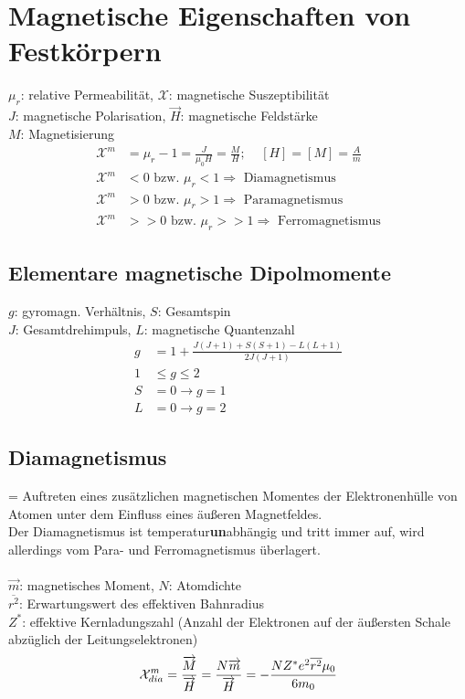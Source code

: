 \documentclass[a4paper,twocolumn,10pt]{article}
\begin{document}
\section{Magnetische Eigenschaften von Festkörpern}
$\mu_r$: relative Permeabilität, $\mathcal{X}$: magnetische Suszeptibilität\\
$J$: magnetische Polarisation, $\overrightarrow{H}$: magnetische Feldstärke\\
$M$: Magnetisierung
\begin{equation*}
\begin{split}
\mathcal{X}^m&=\mu_r-1=\frac{J}{\mu_0H}=\frac{M}{H};\;\;\;\;[H]=[M]=\frac{A}{m}\\
\mathcal{X}^m&<0\text{ bzw. }\mu_r<1\Rightarrow\text{ Diamagnetismus}\\
\mathcal{X}^m&>0\text{ bzw. }\mu_r>1\Rightarrow\text{ Paramagnetismus}\\
\mathcal{X}^m&>>0\text{ bzw. }\mu_r>>1\Rightarrow\text{ Ferromagnetismus}
\end{split}
\end{equation*}

\subsection{Elementare magnetische Dipolmomente}
$g$: gyromagn. Verhältnis, $S$: Gesamtspin\\
$J$: Gesamtdrehimpuls, $L$: magnetische Quantenzahl
\begin{equation*}
\begin{split}
g&=1+\frac{J(J+1)+S(S+1)-L(L+1)}{2J(J+1)}\\
1&\leq g\leq 2\\
S&=0\rightarrow g=1\\
L&=0\rightarrow g=2
\end{split}
\end{equation*}

\subsection{Diamagnetismus}
= Auftreten eines zusätzlichen magnetischen Momentes der Elektronenhülle von Atomen unter dem Einfluss eines äußeren Magnetfeldes.\\
Der Diamagnetismus ist temperatur\textbf{un}abhängig und tritt immer auf, wird allerdings vom Para- und Ferromagnetismus überlagert.\\\\
$\overrightarrow{m}$: magnetisches Moment, $N$: Atomdichte\\
$\overline{r^2}$: Erwartungswert des effektiven Bahnradius\\
$Z^*$: effektive Kernladungszahl (Anzahl der Elektronen auf der äußersten Schale abzüglich der Leitungselektronen)
\begin{equation*}
\mathcal{X}_{dia}^m=\frac{\overrightarrow{M}}{\overrightarrow{H}}=\frac{N\overrightarrow{m}}{\overrightarrow{H}}=-\frac{NZ^*e^2\overline{r^2}\mu_0}{6m_0}\\
\end{equation*}
\end{document}
